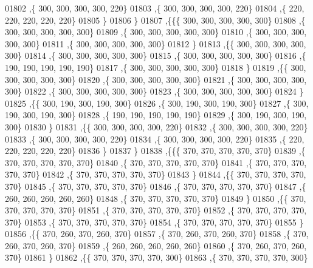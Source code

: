 \begin{DoxyCode}
01802    ,\{   300,   300,   300,   300,   220\}
01803    ,\{   300,   300,   300,   300,   220\}
01804    ,\{   220,   220,   220,   220,   220\}
01805    \}
01806   \}
01807  ,\{\{\{   300,   300,   300,   300,   300\}
01808    ,\{   300,   300,   300,   300,   300\}
01809    ,\{   300,   300,   300,   300,   300\}
01810    ,\{   300,   300,   300,   300,   300\}
01811    ,\{   300,   300,   300,   300,   300\}
01812    \}
01813   ,\{\{   300,   300,   300,   300,   300\}
01814    ,\{   300,   300,   300,   300,   300\}
01815    ,\{   300,   300,   300,   300,   300\}
01816    ,\{   190,   190,   190,   190,   190\}
01817    ,\{   300,   300,   300,   300,   300\}
01818    \}
01819   ,\{\{   300,   300,   300,   300,   300\}
01820    ,\{   300,   300,   300,   300,   300\}
01821    ,\{   300,   300,   300,   300,   300\}
01822    ,\{   300,   300,   300,   300,   300\}
01823    ,\{   300,   300,   300,   300,   300\}
01824    \}
01825   ,\{\{   300,   190,   300,   190,   300\}
01826    ,\{   300,   190,   300,   190,   300\}
01827    ,\{   300,   190,   300,   190,   300\}
01828    ,\{   190,   190,   190,   190,   190\}
01829    ,\{   300,   190,   300,   190,   300\}
01830    \}
01831   ,\{\{   300,   300,   300,   300,   220\}
01832    ,\{   300,   300,   300,   300,   220\}
01833    ,\{   300,   300,   300,   300,   220\}
01834    ,\{   300,   300,   300,   300,   220\}
01835    ,\{   220,   220,   220,   220,   220\}
01836    \}
01837   \}
01838  ,\{\{\{   370,   370,   370,   370,   370\}
01839    ,\{   370,   370,   370,   370,   370\}
01840    ,\{   370,   370,   370,   370,   370\}
01841    ,\{   370,   370,   370,   370,   370\}
01842    ,\{   370,   370,   370,   370,   370\}
01843    \}
01844   ,\{\{   370,   370,   370,   370,   370\}
01845    ,\{   370,   370,   370,   370,   370\}
01846    ,\{   370,   370,   370,   370,   370\}
01847    ,\{   260,   260,   260,   260,   260\}
01848    ,\{   370,   370,   370,   370,   370\}
01849    \}
01850   ,\{\{   370,   370,   370,   370,   370\}
01851    ,\{   370,   370,   370,   370,   370\}
01852    ,\{   370,   370,   370,   370,   370\}
01853    ,\{   370,   370,   370,   370,   370\}
01854    ,\{   370,   370,   370,   370,   370\}
01855    \}
01856   ,\{\{   370,   260,   370,   260,   370\}
01857    ,\{   370,   260,   370,   260,   370\}
01858    ,\{   370,   260,   370,   260,   370\}
01859    ,\{   260,   260,   260,   260,   260\}
01860    ,\{   370,   260,   370,   260,   370\}
01861    \}
01862   ,\{\{   370,   370,   370,   370,   300\}
01863    ,\{   370,   370,   370,   370,   300\}

\end{DoxyCode}
